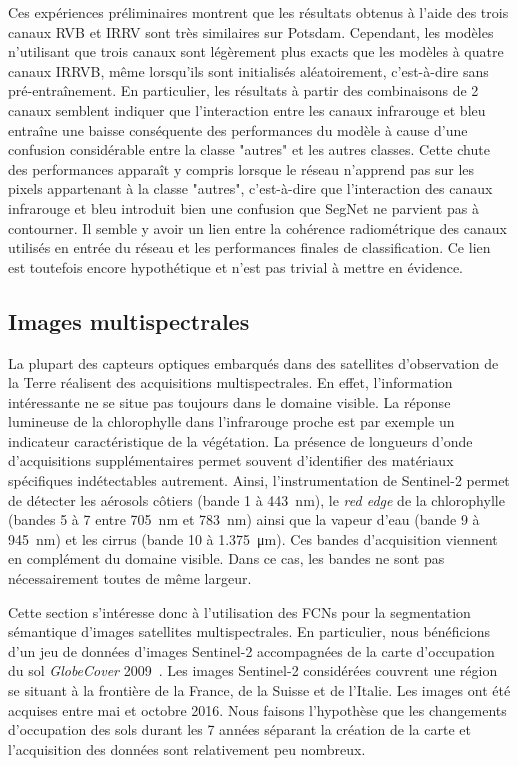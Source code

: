 Ces expériences préliminaires montrent que les résultats obtenus à l'aide des trois canaux \gls{RVB} et \gls{IRRV} sont très similaires sur Potsdam. Cependant, les modèles n'utilisant que trois canaux sont légèrement plus exacts que les modèles à quatre canaux \gls{IRRVB}, même lorsqu'ils sont initialisés aléatoirement, c'est-à-dire sans pré-entraînement. En particulier, les résultats à partir des combinaisons de 2 canaux semblent indiquer que l'interaction entre les canaux infrarouge et bleu entraîne une baisse conséquente des performances du modèle à cause d'une confusion considérable entre la classe "autres" et les autres classes. Cette chute des performances apparaît y compris lorsque le réseau n'apprend pas sur les pixels appartenant à la classe "autres", c'est-à-dire que l'interaction des canaux infrarouge et bleu introduit bien une confusion que SegNet ne parvient pas à contourner. Il semble y avoir un lien entre la cohérence radiométrique des canaux utilisés en entrée du réseau et les performances finales de classification. Ce lien est toutefois encore hypothétique et n'est pas trivial à mettre en évidence.

\subsection{Images multispectrales}
\label{sec:multispectral}

La plupart des capteurs optiques embarqués dans des satellites d'observation de la Terre réalisent des acquisitions multispectrales. En effet, l'information intéressante ne se situe pas toujours dans le domaine visible. La réponse lumineuse de la chlorophylle dans l'infrarouge proche est par exemple un indicateur caractéristique de la végétation. La présence de longueurs d'onde d'acquisitions supplémentaires permet souvent d'identifier des matériaux spécifiques indétectables autrement. Ainsi, l'instrumentation de \gls{Sentinel}-2 permet de détecter les aérosols côtiers (bande 1 à \SI{443}{\nano\meter}), le \emph{red edge} de la chlorophylle (bandes 5 à 7 entre \SI{705}{\nano\meter} et \SI{783}{\nano\meter}) ainsi que la vapeur d'eau (bande 9 à \SI{945}{\nano\meter}) et les cirrus (bande 10 à \SI{1,375}{\micro\meter}). Ces bandes d'acquisition viennent en complément du domaine visible. Dans ce cas, les bandes ne sont pas nécessairement toutes de même largeur.

Cette section s'intéresse donc à l'utilisation des \glspl{FCN} pour la segmentation sémantique d'images satellites multispectrales. En particulier, nous bénéficions d'un jeu de données d'images Sentinel-2 accompagnées de la carte d'occupation du sol \emph{GlobeCover} 2009~\cite{arino_global_2012}. Les images Sentinel-2 considérées couvrent une région se situant à la frontière de la France, de la Suisse et de l'Italie. Les images ont été acquises entre mai et octobre 2016. Nous faisons l'hypothèse que les changements d'occupation des sols durant les 7 années séparant la création de la carte et l'acquisition des données sont relativement peu nombreux.

